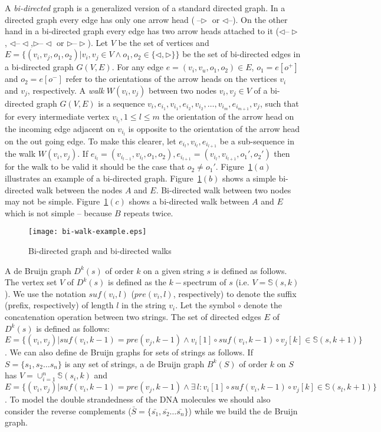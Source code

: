 \documentclass[11pt,conference,twocolumn]{IEEEtran}
\begin{document}
A {\em bi-directed} graph is a generalized version of a standard directed graph. In a directed graph every 
edge has only one arrow head ($\text{--}\rhd$ or $\lhd\text{--}$). On the other hand in a bi-directed graph 
every edge has two arrow heads attached to it ($\lhd\text{--}\rhd$, $\lhd\text{--}\lhd$,$\rhd\text{--}\lhd$ or $\rhd\text{--}\rhd$).
Let $V$ be the set of vertices and 
$E = \{(v_i,v_j,o_1,o_2) | v_i,v_j\in V \wedge o_1,o_2\in\{\lhd,\rhd\}\}$ be the set of bi-directed edges 
in a bi-directed graph $G(V,E)$. For any edge $e = (v_i,v_u,o_1,o_2)\in E$,
$o_1=e[o^+] $ and $o_2=e[o^-]$ refer to the orientations of the arrow heads on the vertices $v_i$ and $v_j$,
respectively. A {\em walk} $W(v_i,v_j)$ between two 
nodes $v_i,v_j \in V$ of a bi-directed graph $G(V,E)$ is a sequence 
$v_i,e_{i_1},v_{i_1},e_{i_2},v_{i_2},\ldots, v_{i_m},e_{i_{m+1}},v_j$, such that for every intermediate 
vertex $v_{i_l},1\leq l \leq m$ the orientation of the arrow head on the incoming
edge adjacent on $v_{i_l}$ is opposite to the orientation of the arrow head on the out going edge.
To make this clearer, let $e_{i_l},v_{i_l},e_{i_{l+1}}$ be a sub-sequence in the walk $W(v_i,v_j)$.
If $e_{i_l}=(v_{i_{l-1}},v_{i_l},o_1,o_2), e_{i_{l+1}} = (v_{i_{l}},v_{i_{l+1}},o_1',o_2')$
then for the walk to be valid it should be the case that $o_2 \neq o_1'$. Figure~\ref{fig:bi-walk-example}$(a)$ 
illustrates an example of a bi-directed graph. Figure~\ref{fig:bi-walk-example}$(b)$ shows a simple
bi-directed walk between the nodes $A$ and $E$. Bi-directed walk between two nodes may not be simple.
Figure~\ref{fig:bi-walk-example}$(c)$ shows a bi-directed walk between $A$ and $E$ which is not 
simple -- because $B$ repeats twice.
\begin{figure}
\begin{center}
\texttt{[image: bi-walk-example.eps]}
\end{center}
\caption{Bi-directed graph and bi-directed walks}
\label{fig:bi-walk-example}
\end{figure}


A de Bruijn graph $D^k(s)$ of order $k$ on a given string $s$ is defined as follows. 
The vertex set $V$ of $D^k(s)$ is defined as the $k-$spectrum of $s$ (i.e. $V = \mathbb{S}(s,k)$). 
We use the notation $suf(v_i,l)$ ($pre(v_i,l)$, respectively) to denote the suffix (prefix, respectively) of length $l$ in the string $v_i$.
Let the symbol $\circ$ denote the concatenation operation between two strings. The set of directed edges $E$ of $D^k(s)$ 
is defined as follows: $E = \{(v_i,v_j) | suf(v_i,k-1)=pre(v_j,k-1) \wedge v_i[1]\circ suf(v_i,k-1)\circ v_j[k] 
\in \mathbb{S}(s,k+1) \}$. We can also define de Bruijn graphs for sets of strings as follows. If $S=\{s_1,s_2\ldots s_n\}$ is any set
of strings, a de Bruijn graph $B^k(S)$ of order $k$ on $S$ has $V = \displaystyle\cup_{i=1}^{n} \mathbb{S}(s_i,k)$
and $E = \{(v_i,v_j) | suf(v_i,k-1) = pre(v_j,k-1) \wedge \exists \, l : v_i[1]\circ suf(v_i,k-1)\circ v_j[k]\in \mathbb{S}(s_l,k+1)\}$.
To model the double strandedness of the DNA molecules we should also consider the reverse 
complements ($\bar{S} =\{\bar{s_1},\bar{s_2}\ldots \bar{s_n}\}$) while we build the de Bruijn graph. 
\end{document}
